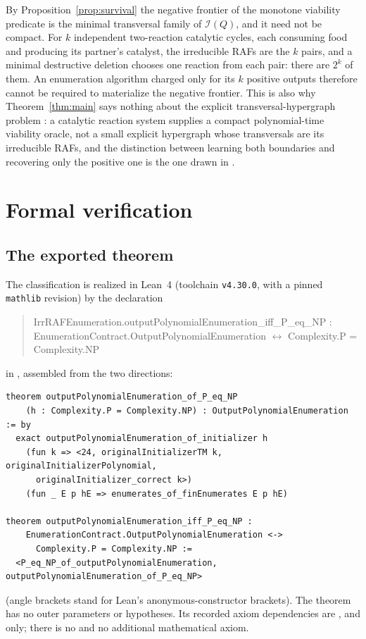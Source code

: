 \documentclass[11pt,a4paper]{article}
\theoremstyle{plain}
\theoremstyle{definition}
\theoremstyle{remark}
\newcommand{\Irr}{\mathcal I}
\begin{document}
By Proposition~\ref{prop:survival} the negative frontier of the monotone viability predicate is the minimal transversal family of $\Irr(Q)$, and it need not be compact. For $k$ independent two-reaction catalytic cycles, each consuming food and producing its partner's catalyst, the irreducible RAFs are the $k$ pairs, and a minimal destructive deletion chooses one reaction from each pair: there are $2^k$ of them. An enumeration algorithm charged only for its $k$ positive outputs therefore cannot be required to materialize the negative frontier. This is also why Theorem~\ref{thm:main} says nothing about the explicit transversal-hypergraph problem \cite{fredman1996complexity,eiter1995identifying,mary2024enumeration}: a catalytic reaction system supplies a compact polynomial-time viability oracle, not a small explicit hypergraph whose transversals are its irreducible RAFs, and the distinction between learning both boundaries and recovering only the positive one is the one drawn in \cite{bioch1995complexity}.

\section{Formal verification}\label{sec:formal}

\subsection{The exported theorem}

The classification is realized in Lean~4 (toolchain \texttt{v4.30.0}, with a pinned \texttt{mathlib} revision) by the declaration
\begin{quote}\raggedright\ttfamily\small
IrrRAFEnumeration.outputPolynomialEnumeration\_iff\_P\_eq\_NP :\\
\quad EnumerationContract.OutputPolynomialEnumeration $\leftrightarrow$ Complexity.P = Complexity.NP
\end{quote}
in , assembled from the two directions:
\begin{small}\begin{verbatim}
theorem outputPolynomialEnumeration_of_P_eq_NP
    (h : Complexity.P = Complexity.NP) : OutputPolynomialEnumeration := by
  exact outputPolynomialEnumeration_of_initializer h
    (fun k => <24, originalInitializerTM k, originalInitializerPolynomial,
      originalInitializer_correct k>)
    (fun _ E p hE => enumerates_of_finEnumerates E p hE)

theorem outputPolynomialEnumeration_iff_P_eq_NP :
    EnumerationContract.OutputPolynomialEnumeration <->
      Complexity.P = Complexity.NP :=
  <P_eq_NP_of_outputPolynomialEnumeration, outputPolynomialEnumeration_of_P_eq_NP>
\end{verbatim}\end{small}
(angle brackets stand for Lean's anonymous-constructor brackets). The theorem has no outer parameters or hypotheses. Its recorded axiom dependencies are ,  and  only; there is no  and no additional mathematical axiom.
\end{document}
